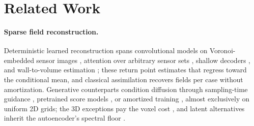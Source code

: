 \documentclass{article} %
\begin{document}
\section{Related Work}
\label{sec:related}

\paragraph{Sparse field reconstruction.}
Deterministic learned reconstruction spans convolutional models on Voronoi-embedded sensor images \citep{fukami2021global}, attention over arbitrary sensor sets \citep{santos2023senseiver,dang2025flronet}, shallow decoders \citep{erichson2020shallow}, and wall-to-volume estimation \citep{guastoni2021convolutional,cuellar2024three,mousavi2025low}; these return point estimates that regress toward the conditional mean, and classical assimilation \citep{raissi2020hidden,cai2021flow} recovers fields per case without amortization. Generative counterparts condition diffusion through sampling-time guidance \citep{shu2023physics,huang2024diffusionpde,amoros2026guiding,chung2023diffusion,rozet2023score}, pretrained score models \citep{li2024s3gm}, or amortized training \citep{zhuang2025spatially,liu2024uncertainty}, almost exclusively on uniform 2D grids; the 3D exceptions pay the voxel cost \citep{oommen2026turbulent,lienen2024zero}, and latent alternatives \citep{du2024confild,zhou2025text2pde,lino2025dgn} inherit the autoencoder's spectral floor \citep{rafiq2026spectrally,glaws2020deep}.
\end{document}
